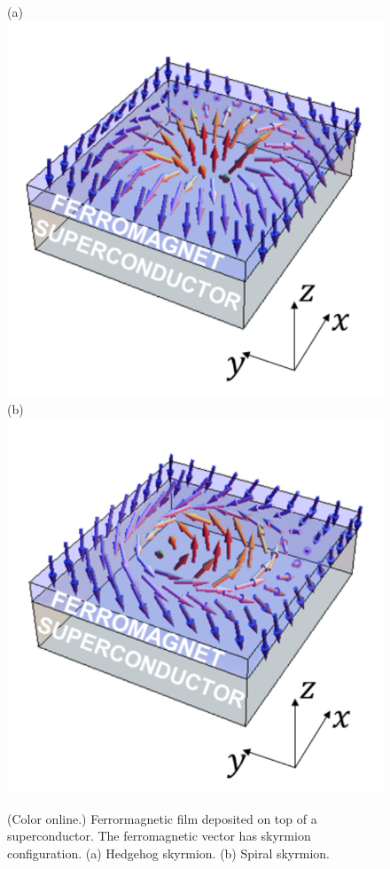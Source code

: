 \documentclass[twocolumn,showpacs,floatfix,nofootinbib,longbibliography]{revtex4-1}
\begin{document}
\begin{figure} \centering
(a) \includegraphics[width=0.4\linewidth]{SkyrmA}
(b) \includegraphics[width=0.4\linewidth]{SkyrmB}
\caption{(Color online.) Ferrormagnetic film deposited on top of a superconductor. The ferromagnetic vector has skyrmion configuration. (a) Hedgehog skyrmion.  (b) Spiral skyrmion. } \label{fig:skyrmion}
\end{figure}
\end{document}
